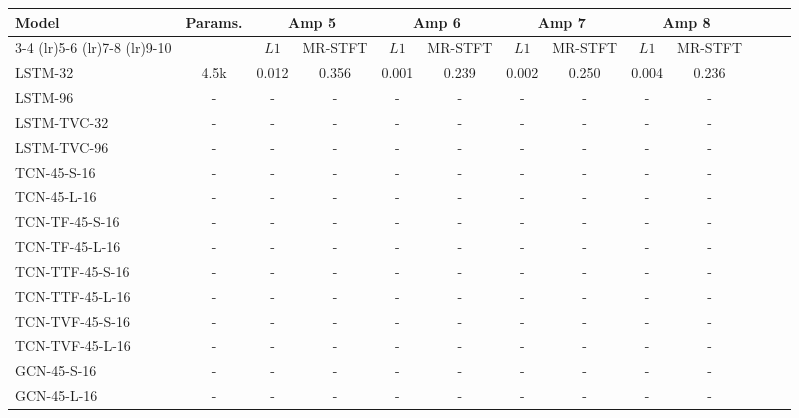\begin{table*}[h]
    \centering
    \small
    \begin{tabular}{lcccccccccccc} \toprule
    
        \multirow{2}{*}{Model} 
            & \multirow{2}{*}{Params.} 
                & \multicolumn{2}{c}{Amp 5} 
                    & \multicolumn{2}{c}{Amp 6} 
                        &  \multicolumn{2}{c}{Amp 7} 
                            & \multicolumn{2}{c}{Amp 8} \\ 
        \cmidrule(lr){3-4} 
            \cmidrule(lr){5-6} 
                \cmidrule(lr){7-8} 
                    \cmidrule(lr){9-10}
        &   & $L1$ & MR-STFT & $L1$ & MR-STFT & $L1$ & MR-STFT & $L1$ & MR-STFT \\ 
        \midrule
        LSTM-32
            & 4.5k  & 0.012 & 0.356 & 0.001 & 0.239 & 0.002 & 0.250 & 0.004 & 0.236 \\ 
        LSTM-96       
            & - & - & - & - & - & - & - & - & - \\ 
        \midrule
        LSTM-TVC-32
            & - & - & - & - & - & - & - & - & - \\
        LSTM-TVC-96
            & - & - & - & - & - & - & - & - & - \\
        \midrule
        TCN-45-S-16               
            & - & - & - & - & - & - & - & - & - \\ 
        TCN-45-L-16               
            & - & - & - & - & - & - & - & - & - \\
        \midrule
        TCN-TF-45-S-16               
            & - & - & - & - & - & - & - & - & - \\
        TCN-TF-45-L-16               
            & - & - & - & - & - & - & - & - & - \\
        \midrule
        TCN-TTF-45-S-16               
            & - & - & - & - & - & - & - & - & - \\
        TCN-TTF-45-L-16               
            & - & - & - & - & - & - & - & - & - \\
        \midrule
        TCN-TVF-45-S-16               
            & - & - & - & - & - & - & - & - & - \\
        TCN-TVF-45-L-16               
            & - & - & - & - & - & - & - & - & - \\
        \midrule
        GCN-45-S-16               
            & - & - & - & - & - & - & - & - & - \\ 
        GCN-45-L-16               
            & - & - & - & - & - & - & - & - & - \\

\end{tabular}
\end{table*}
